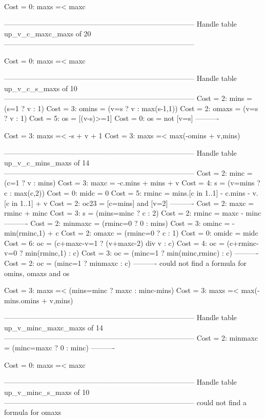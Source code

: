 Cost =  0:  maxs =< maxc

--------------------------------------------------------------------------------
Handle table up_v_c_maxc_maxs of 20
--------------------------------------------------------------------------------

Cost =  0:  maxs =< maxc

--------------------------------------------------------------------------------
Handle table up_v_c_s_maxs of 10
--------------------------------------------------------------------------------
Cost =  2:  mins  = (s=1 ? v : 1)
Cost =  3:  omins = (v=s ? v : max(s-1,1))
Cost =  2:  omaxs = (v=s ? v : 1)
Cost =  5:  os    = [(v-s)>=1]
Cost =  0:  os    = not [v=s]
----------

Cost =  3:  maxs =< -s + v + 1
Cost =  3:  maxs =< max(-omins + v,mins)

--------------------------------------------------------------------------------
Handle table up_v_c_mins_maxs of 14
--------------------------------------------------------------------------------
Cost =  2:  minc    = (c=1 ? v : mins)
Cost =  3:  maxc    = -c.mins + mins + v
Cost =  4:  s       = (v=mins ? c : max(c,2))
Cost =  0:  midc    = 0
Cost =  5:  rminc   = mins.[c in 1..1] - c.mins - v.[c in 1..1] + v
Cost =  2:  oc23    = [c=mins] and [v=2]
----------
Cost =  2:  maxc    = rminc + minc
Cost =  3:  s       = (mins=minc ? c : 2)
Cost =  2:  rminc   = maxc - minc
----------
Cost =  2:  minmaxc = (rminc=0 ? 0 : mins)
Cost =  3:  ominc   = -min(rminc,1) + c
Cost =  2:  omaxc   = (rminc=0 ? c : 1)
Cost =  0:  omidc   = midc
Cost =  6:  oc      = (c+maxc-v=1 ? (v+maxc-2) div v : c)
Cost =  4:  oc      = (c+rminc-v=0 ? min(rminc,1) : c)
Cost =  3:  oc      = (minc=1 ? min(minc,rminc) : c)
----------
Cost =  2:  oc      = (minc=1 ? minmaxc : c)
----------
could not find a formula for omins, omaxs and os

Cost =  3:  maxs =< (mins=minc ? maxc : minc-mins)
Cost =  3:  maxs =< max(-mins.omins + v,mins)

--------------------------------------------------------------------------------
Handle table up_v_minc_maxc_maxs of 14
--------------------------------------------------------------------------------
Cost =  2:  minmaxc = (minc=maxc ? 0 : minc)
----------

Cost =  0:  maxs =< maxc

--------------------------------------------------------------------------------
Handle table up_v_minc_s_maxs of 10
--------------------------------------------------------------------------------
could not find a formula for omaxs


